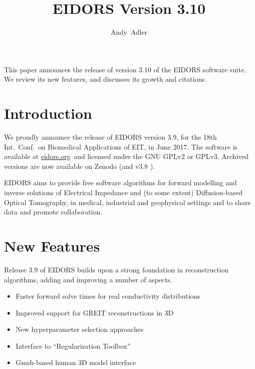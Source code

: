 \documentclass[10pt,letterpaper]{article}
\title{EIDORS Version 3.10%
\vspace{-2ex}} %
\author{Andy~Adler}
\affil{Carleton University, Ottawa, Canada}
\date{}
\begin{document}
\maketitle
\vspace{-1.5cm}
\thispagestyle{empty}

\begin{multicols}{2}

This paper announces the release of version 3.10 of the
EIDORS software suite. We review its new features, and 
discusses its growth and citations.

\section{Introduction}
We proudly announce the release of EIDORS version 3.9,
for the 18th Int.\ Conf.\ on Biomedical Applications of EIT,
in June 2017.
The software is available at \href{www.eidors.org}{eidors.org}\, and licensed under the GNU GPLv2 or GPLv3. Archived versions are now available on Zenodo
\cite{eidors3p9} (and v3.8 \cite{eidors3p8}).


EIDORS aims to provide free software algorithms for forward modelling
and inverse solutions
of Electrical Impedance and (to some extent) Diffusion-based Optical Tomography, in
medical, industrial and geophysical settings and to share data and promote
collaboration.

\section{New Features}
Release 3.9 of EIDORS builds upon a strong foundation in reconstruction
algorithms, adding and improving a number of aspects.
\begin{itemize}
\item Faster forward solve times for real conductivity distributions

\item Improved support for GREIT reconstructions in 3D \cite{grychtol2016}

\item New hyperparameter selection approaches \cite{braun2017}

\item Interface to ``Regularization Toolbox'' \cite{hansen2007}

\item Gmsh-based human 3D model interface \cite{grychtol2016}


\end{itemize}
\end{multicols}
\end{document}
